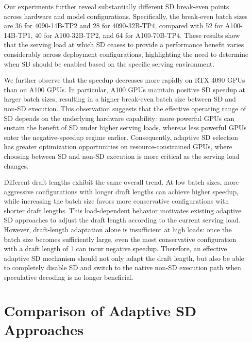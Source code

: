 Our experiments further reveal substantially different SD break-even points across hardware and model configurations.
Specifically, the break-even batch sizes are 36 for 4090-14B-TP2 and 28 for 4090-32B-TP4, compared with 52 for A100-14B-TP1, 40 for A100-32B-TP2, and 64 for A100-70B-TP4.
These results show that the serving load at which SD ceases to provide a performance benefit varies considerably across deployment configurations, highlighting the need to determine when SD should be enabled based on the specific serving environment.

We further observe that the speedup decreases more rapidly on RTX 4090 GPUs than on A100 GPUs.
In particular, A100 GPUs maintain positive SD speedup at larger batch sizes, resulting in a higher break-even batch size between SD and non-SD execution.
This observation suggests that the effective operating range of SD depends on the underlying hardware capability: more powerful GPUs can sustain the benefit of SD under higher serving loads, whereas less powerful GPUs enter the negative-speedup regime earlier.
Consequently, adaptive SD selection has greater optimization opportunities on resource-constrained GPUs, where choosing between SD and non-SD execution is more critical as the serving load changes.

Different draft lengths exhibit the same overall trend.
At low batch sizes, more aggressive configurations with longer draft lengths can achieve higher speedup, while increasing the batch size favors more conservative configurations with shorter draft lengths.
This load-dependent behavior motivates existing adaptive SD approaches to adjust the draft length according to the current serving load.
However, draft-length adaptation alone is insufficient at high loads: once the batch size becomes sufficiently large, even the most conservative configuration with a draft length of 1 can incur negative speedup.
Therefore, an effective adaptive SD mechanism should not only adapt the draft length, but also be able to completely disable SD and switch to the native non-SD execution path when speculative decoding is no longer beneficial.

\clearpage

\section{Comparison of Adaptive SD Approaches}
\label{dynamic-sd-comparison}

